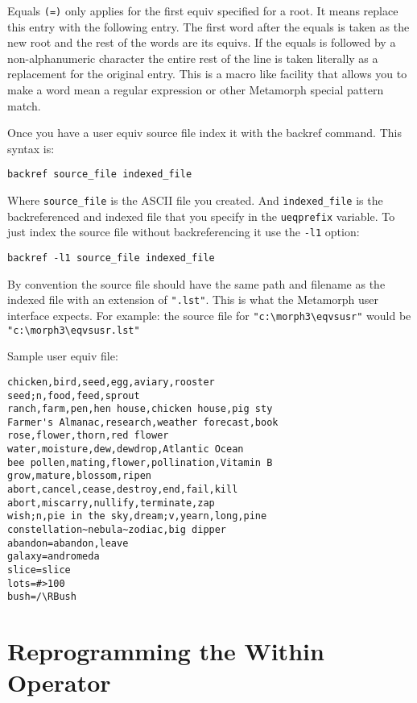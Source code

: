 Equals \verb`(=)` only applies for the first equiv specified for a root.
It means replace this entry with the following entry.  The first
word after the equals is taken as the new root and the rest of the
words are its equivs.  If the equals is followed by a
non-alphanumeric character the entire rest of the line is taken
literally as a replacement for the original entry.  This is a
macro like facility that allows you to make a word mean a regular
expression or other Metamorph special pattern match.

Once you have a user equiv source file index it with the backref
command.  This syntax is:
\begin{verbatim}
backref source_file indexed_file
\end{verbatim}

Where \verb`source_file` is the ASCII file you created.  And \verb`indexed_file`
is the backreferenced and indexed file that you specify in the
\verb`ueqprefix` variable.  To just index the source file without
backreferencing it use the \verb`-l1` option:

\begin{verbatim}
backref -l1 source_file indexed_file
\end{verbatim}
By convention the source file should have the same path and
filename as the indexed file with an extension of \verb`".lst"`.  This is
what the Metamorph user interface expects.  For example:  the
source file for \verb`"c:\morph3\eqvsusr"` would be
\verb`"c:\morph3\eqvsusr.lst"`

Sample user equiv file:
\begin{verbatim}
chicken,bird,seed,egg,aviary,rooster
seed;n,food,feed,sprout
ranch,farm,pen,hen house,chicken house,pig sty
Farmer's Almanac,research,weather forecast,book
rose,flower,thorn,red flower
water,moisture,dew,dewdrop,Atlantic Ocean
bee pollen,mating,flower,pollination,Vitamin B
grow,mature,blossom,ripen
abort,cancel,cease,destroy,end,fail,kill
abort,miscarry,nullify,terminate,zap
wish;n,pie in the sky,dream;v,yearn,long,pine
constellation~nebula~zodiac,big dipper
abandon=abandon,leave
galaxy=andromeda
slice=slice
lots=#>100
bush=/\RBush
\end{verbatim}

\section {Reprogramming the Within Operator}

